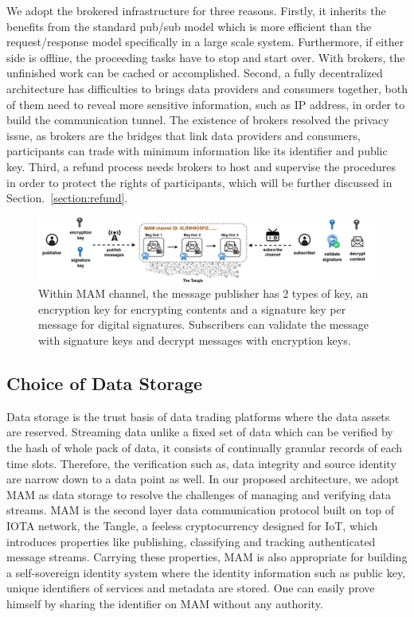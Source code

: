 \documentclass[conference]{IEEEtran}
\begin{document}
We adopt the brokered infrastructure for three reasons. Firstly, it inherits the benefits from the standard pub/sub model which is more efficient than the request/response model specifically in a large scale system. Furthermore, if either side is offline, the proceeding tasks have to stop and start over. With brokers, the unfinished work can be cached or accomplished. Second, a fully decentralized architecture has difficulties to brings data providers and consumers together, both of them need to reveal more sensitive information, such as IP address, in order to build the communication tunnel. The existence of brokers resolved the privacy issue, as brokers are the bridges that link data providers and consumers, participants can trade with minimum information like its identifier and public key. Third, a refund process needs brokers to host and supervise the procedures in order to protect the rights of participants, which will be further discussed in Section.~\ref{section:refund}.

\begin{figure}[!t]
    \centering
    \includegraphics[width=\linewidth]{channel_and_key}
    \caption{Within MAM channel, the message publisher has 2 types of key, an encryption key for encrypting contents and a signature key per message for digital signatures. Subscribers can validate the message with signature keys and decrypt messages with encryption keys.}
    \label{fig:channel_and_key}
\end{figure}


\subsection{Choice of Data Storage}
Data storage is the trust basis of data trading platforms where the data assets are reserved. Streaming data unlike a fixed set of data which can be verified by the hash of whole pack of data, it consists of continually granular records of each time slots. Therefore, the verification such as, data integrity and source identity are narrow down to a data point as well. In our proposed architecture, we adopt MAM as data storage to resolve the challenges of managing and verifying data streams. MAM is the second layer data communication protocol built on top of IOTA\cite{IOTAwhitepaper} network, the Tangle, a feeless cryptocurrency designed for IoT, which introduces properties like publishing, classifying and tracking authenticated message streams. Carrying these properties, MAM is also appropriate for building a self-sovereign identity system where the identity information such as public key, unique identifiers of services and metadata are stored. One can easily prove himself by sharing the identifier on MAM without any authority.
\end{document}
